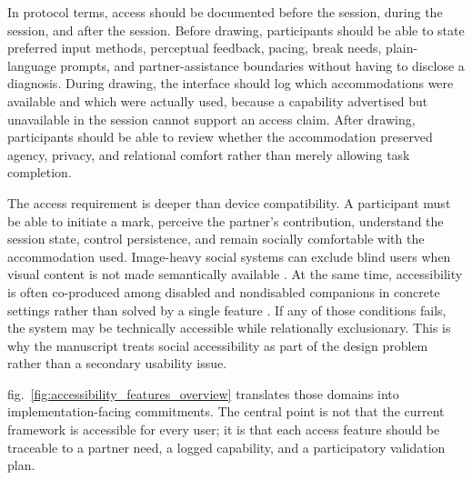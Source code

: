 \documentclass[
  english,
]{article}
\begin{document}
In protocol terms, access should be documented before the session,
during the session, and after the session. Before drawing, participants
should be able to state preferred input methods, perceptual feedback,
pacing, break needs, plain-language prompts, and partner-assistance
boundaries without having to disclose a diagnosis. During drawing, the
interface should log which accommodations were available and which were
actually used, because a capability advertised but unavailable in the
session cannot support an access claim. After drawing, participants
should be able to review whether the accommodation preserved agency,
privacy, and relational comfort rather than merely allowing task
completion.

The access requirement is deeper than device compatibility. A
participant must be able to initiate a mark, perceive the partner's
contribution, understand the session state, control persistence, and
remain socially comfortable with the accommodation used. Image-heavy
social systems can exclude blind users when visual content is not made
semantically available \citep{morris2016pictures}. At the same time,
accessibility is often co-produced among disabled and nondisabled
companions in concrete settings rather than solved by a single feature
\citep{branham2015collaborativeaccess}. If any of those conditions
fails, the system may be technically accessible while relationally
exclusionary. This is why the manuscript treats social accessibility as
part of the design problem rather than a secondary usability issue.

fig.~\ref{fig:accessibility_features_overview} translates those domains
into implementation-facing commitments. The central point is not that
the current framework is accessible for every user; it is that each
access feature should be traceable to a partner need, a logged
capability, and a participatory validation plan.
\end{document}
